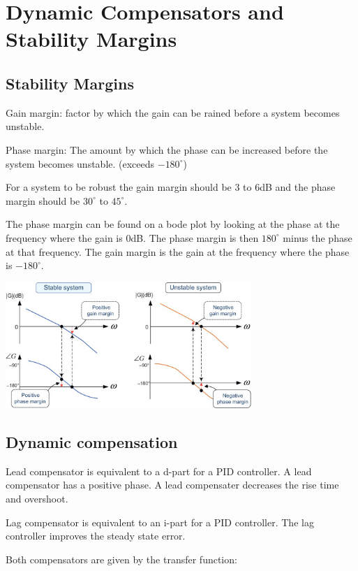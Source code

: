 \section{Dynamic Compensators and Stability Margins}

\subsection{Stability Margins}

Gain margin: factor by which the gain can be rained before a system becomes unstable.

Phase margin: The amount by which the phase can be increased before the system becomes unstable. (exceeds $-180 ^\circ$)


For a system to be robust the gain margin should be 3 to 6dB and the phase margin
should be $30^\circ$ to $45^\circ$.

The phase margin can be found on a bode plot by looking at the phase at the frequency
where the gain is 0dB. The phase margin is then $180^\circ$ minus the phase at that frequency.
The gain margin is the gain at the frequency where the phase is $-180^\circ$.


\begin{center}
	\includegraphics[width=0.7\textwidth]{Images/margin.jpg}
\end{center}

\subsection{Dynamic compensation}

Lead compensator is equivalent to a d-part for a PID controller.
A lead compensator has a positive phase. A lead compensater decreases
the rise time and overshoot.

Lag compensator is equivalent to an i-part for a PID controller.
The lag controller improves the steady state error.

Both compensators are given by the transfer function:

